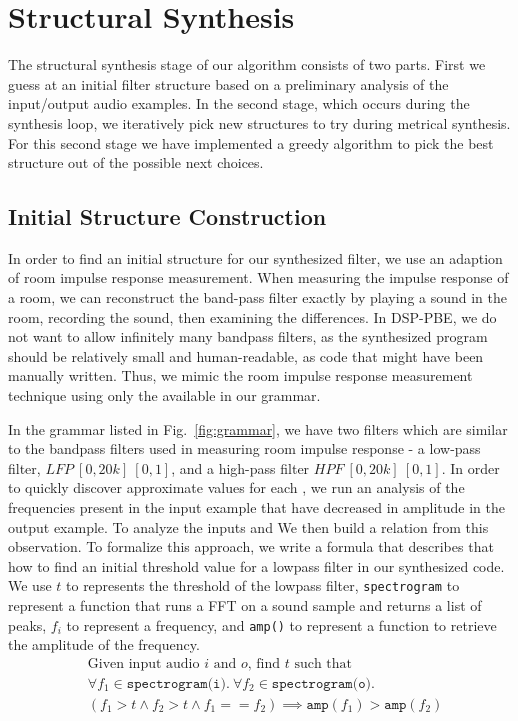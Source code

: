 \section{Structural Synthesis}
\label{sec:struct}

The structural synthesis stage of our algorithm consists of two parts.
First we guess at an initial filter structure based on a preliminary analysis of the input/output audio examples.
In the second stage, which occurs during the synthesis loop, we iteratively pick new structures to try during metrical synthesis.
For this second stage we have implemented a greedy algorithm to pick the best structure out of the possible next choices.

\subsection{Initial Structure Construction}
\label{sec:initStruct}
In order to find an initial structure for our synthesized filter, we use an adaption of room impulse response measurement.
When measuring the impulse response of a room, we can reconstruct the band-pass filter exactly by playing a sound in the room, recording the sound, then examining the differences.
In DSP-PBE, we do not want to allow infinitely many bandpass filters, as the synthesized program should be relatively small and human-readable, as code that might have been manually written.
Thus, we mimic the room impulse response measurement technique using only the available \dspnode in our grammar.

In the grammar listed in Fig.~\ref{fig:grammar}, we have two filters which are similar to the bandpass filters used in measuring room impulse response - a low-pass filter, $LFP \ [0,20k]\ [0,1]$, and a high-pass filter $HPF\ [0,20k]\ [0,1]$.
In order to quickly discover approximate values for each \dspnode, we run an analysis of the frequencies present in the input example that have decreased in amplitude in the output example.
To analyze the inputs and 
We then build a relation from this observation.
To formalize this approach, we write a formula that describes that how to find an initial threshold value for a lowpass filter in our synthesized code.
We use $t$ to represents the threshold of the lowpass filter, \texttt{spectrogram} to represent a function that runs a FFT on a sound sample and returns a list of peaks, $f_i$ to represent a frequency, and \texttt{amp()} to represent a function to retrieve the amplitude of the frequency. 
%
\begin{align*}
&\text{Given input audio }i\text{ and }o\text{, find }t\text{ such that} \\
&\forall f_1 \in  \texttt{spectrogram(i)}.\ \forall f_2 \in \texttt{spectrogram(o)}. \\
&(f_1 > t \land  f_2 > t \land f_1 == f_2) \implies \texttt{amp}(f_1) > \texttt{amp}(f_2)
\end{align*}


